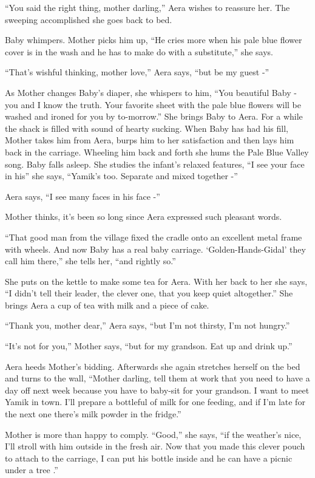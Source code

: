 \documentclass[twoside,11pt]{book}
\begin{document}
``You said the right thing, mother darling,'' Aera wishes to reassure her. The sweeping
accomplished she goes back to bed.

Baby whimpers. Mother picks him up, ``He cries more when his pale blue flower cover is in the wash and he
has to make do with a substitute,'' she says.

``That's wishful thinking, mother love,'' Aera says, ``but be my guest -''

As Mother changes Baby's diaper, she whispers to him, ``You beautiful Baby -  you and I know the truth.
Your favorite sheet with the pale blue flowers will be washed and ironed for you by to-morrow.'' She
brings Baby to Aera. For a while the shack is filled with sound of hearty sucking. When Baby has had his fill, Mother
takes him from Aera, burps him to her satisfaction and then lays him back in the carriage. Wheeling him back and
forth she hums the Pale Blue Valley song. Baby falls asleep. She studies the infant's relaxed features,
``I see your face in his'' she says, ``Yamik's too. Separate and mixed together -''

Aera says, ``I see many faces in his face -''

Mother thinks, it's been so long since Aera expressed such pleasant words.

``That good man from the village fixed the cradle onto an excellent metal frame with
wheels. And now Baby has a real baby carriage. `Golden-Hands-Gidal' they call him there,'' she tells her, ``and rightly
so.''

She puts on the kettle to make some tea for Aera. With her back to her she says, ``I didn't tell their
leader, the clever one, that you keep quiet altogether.'' She brings Aera a cup of tea with milk and a
piece of cake.

``Thank you, mother dear,'' Aera says, ``but I'm not thirsty, I'm not
hungry.''

``It's not for you,'' Mother says, ``but for my grandson. Eat up and drink
up.''

Aera heeds Mother's bidding. Afterwards she again stretches herself on the bed and turns to the wall,
``Mother darling, tell them at work that you need to have a day off next week because you have to baby-sit
for your grandson. I want to meet Yamik in town. I'll prepare a bottleful of milk for one feeding, and if I'm late for
the next one there's  milk powder in the fridge.''

Mother is more than happy to comply. ``Good,'' she says, ``if the weather's nice, I'll stroll with him
outside in the fresh air. Now that you made this clever pouch to attach to the carriage, I can put his bottle inside
and he can have a picnic under a tree .''
\end{document}
